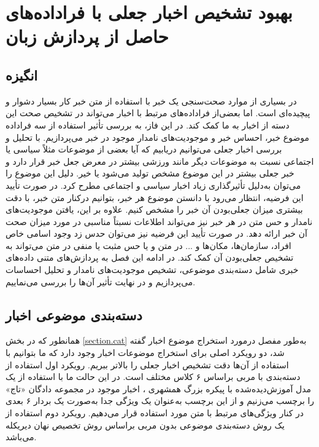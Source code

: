 \chapter{بهبود تشخیص اخبار جعلی با فراداده‌های حاصل از پردازش زبان}
\section{انگیزه}
در بسیاری از موارد  صحت‌سنجی یک خبر با استفاده از متن خبر کار بسیار دشوار و پیچیده‌ای است. اما بعضی‌از فراداده‌های مرتبط با اخبار می‌تواند در تشخیص صحت این دسته از اخبار به ما کمک کند. در این فاز، به بررسی تأثیر استفاده از سه فراداده موضوع خبر، احساس خبر و موجودیت‌های نامدار موجود در خبر می‌پردازیم. با تحلیل و بررسی اخبار جعلی می‌توانیم دریابیم که آیا بعضی از موضوعات مثلاً سیاسی یا اجتماعی نسبت ‌به موضوعات دیگر مانند ورزشی بیشتر در معرض جعل خبر قرار دارد و خبر جعلی بیشتر در این موضوع مشخص تولید می‌شود یا خیر. دلیل این موضوع را می‌توان به‌دلیل تأثیرگذاری زیاد اخبار سیاسی و اجتماعی مطرح کرد. در صورت تأیید این فرضیه، انتظار می‌رود با دانستن موضوع هر خبر، بتوانیم درکنار متن خبر، با دقت بیشتری میزان جعلی‌بودن آن خبر را مشخص کنیم. علاوه بر این، یافتن موجودیت‌های نامدار و حس متن در هر خبر نیز می‌تواند اطلاعات نسبتاً مناسبی در مورد میزان صحت آن خبر ارائه دهد. در صورت تأیید این فرضیه نیز می‌توان حدس زد وجود اسامی خاص افراد، سازمان‌ها، مکان‌ها و ... در متن و یا حس مثبت یا منفی در متن می‌تواند به تشخیص جعلی‌بودن آن کمک کند. در ادامه این فصل به پردازش‌های متنی داده‌های خبری شامل دسته‌بندی موضوعی، تشخیص موجودیت‌های نامدار و تحلیل احساسات می‌پردازیم و در نهایت تأثیر آن‌ها را بررسی می‌نماییم.

\section{دسته‌بندی موضوعی اخبار}
\label{section.cat_detail}
همانطور که در بخش \ref{section.cat} به‌طور مفصل درمورد استخراج موضوع اخبار گفته شد، دو رویکرد اصلی برای استخراج موضوعات اخبار وجود دارد که ما بتوانیم با استفاده از آن‌ها دقت تشخیص اخبار جعلی را بالاتر ببریم. رویکرد اول استفاده از دسته‌بندی با مربی براساس ۶ کلاس مختلف است. در این حالت ما با استفاده از یک مدل آموزش‌دیده‌شده با پیکره بزرگ همشهری \citep{aleahmad2009hamshahri}، اخبار موجود در مجموعه دادگان «تاج» را برچسب می‌زنیم و از این برچسب به‌عنوان یک ویژگی جدا به‌صورت یک بردار ۶ بعدی در کنار ویژگی‌های مرتبط با متن مورد استفاده قرار می‌دهیم. رویکرد دوم استفاده از یک روش دسته‌بندی موضوعی بدون مربی 
	براساس روش تخصیص نهان دیریکله \citep{blei2003latent} می‌باشد. 
	
